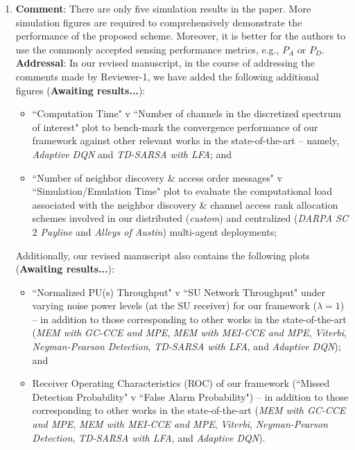 \documentclass{article}
\begin{document}
\begin{enumerate}
    \item \textbf{Comment}: There are only five simulation results in the paper. More simulation figures are required to comprehensively demonstrate the performance of the proposed scheme. Moreover, it is better for the authors to use the commonly accepted sensing performance metrics, e.g., $P_A$ or $P_D$.\\
    \textbf{Addressal}: In our revised manuscript, in the course of addressing the comments made by Reviewer-1, we have added the following additional figures (\textbf{Awaiting results...}):
    \begin{itemize}
        \item ``Computation Time" v ``Number of channels in the discretized spectrum of interest" plot to bench-mark the convergence performance of our framework against other relevant works in the state-of-the-art -- namely, \textit{Adaptive DQN} and \textit{TD-SARSA with LFA}; and
        \item ``Number of neighbor discovery \& access order messages" v ``Simulation/Emulation Time" plot to evaluate the computational load associated with the neighbor discovery \& channel access rank allocation schemes involved in our distributed (\textit{custom}) and centralized (\textit{DARPA SC$2$ Payline} and \textit{Alleys of Austin}) multi-agent deployments;
    \end{itemize}
    Additionally, our revised manuscript also contains the following plots (\textbf{Awaiting results...}):
    \begin{itemize}
        \item ``Normalized PU(s) Throughput" v ``SU Network Throughput" under varying noise power levels (at the SU receiver) for our framework ($\lambda{=}1$) -- in addition to those corresponding to other works in the state-of-the-art (\textit{MEM with GC-CCE and MPE}, \textit{MEM with MEI-CCE and MPE}, \textit{Viterbi}, \textit{Neyman-Pearson Detection}, \textit{TD-SARSA with LFA}, and \textit{Adaptive DQN}); and
        \item Receiver Operating Characteristics (ROC) of our framework (``Missed Detection Probability" v ``False Alarm Probability") -- in addition to those corresponding to other works in the state-of-the-art (\textit{MEM with GC-CCE and MPE}, \textit{MEM with MEI-CCE and MPE}, \textit{Viterbi}, \textit{Neyman-Pearson Detection}, \textit{TD-SARSA with LFA}, and \textit{Adaptive DQN}).\\
    \end{itemize}
    \clearpage
\end{enumerate}
\end{document}
